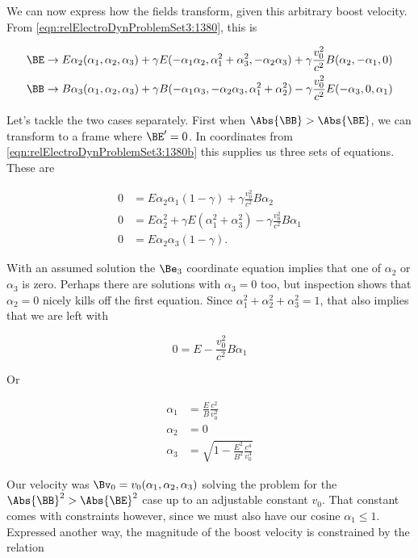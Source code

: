 We can now express how the fields transform, given this arbitrary boost velocity.  From \ref{eqn:relElectroDynProblemSet3:1380}, this is

\begin{align}\label{eqn:relElectroDynProblemSet3:1380b}
\BE &\rightarrow 
E \alpha_2 (\alpha_1, \alpha_2, \alpha_3) 
+ \gamma E (-\alpha_1 \alpha_2, \alpha_1^2 + \alpha_3^2, -\alpha_2 \alpha_3) 
+ \gamma \frac{v_0^2}{c^2} 
B (\alpha_2, -\alpha_1, 0) \\
\BB &\rightarrow
B \alpha_3 (\alpha_1, \alpha_2, \alpha_3)
+ \gamma B (-\alpha_1 \alpha_3, -\alpha_2 \alpha_3, \alpha_1^2 + \alpha_2^2)  
- \gamma \frac{v_0^2}{c^2} E (-\alpha_3, 0, \alpha_1)
\end{align}


Let's tackle the two cases separately.  First when $\Abs{\BB} > \Abs{\BE}$, we can transform to a frame where $\BE'=0$.  In coordinates from \ref{eqn:relElectroDynProblemSet3:1380b} this supplies us three sets of equations.  These are

\begin{align}\label{eqn:relElectroDynProblemSet3:1660}
0 &= E \alpha_2 \alpha_1 (1 - \gamma) + \gamma \frac{v_0^2}{c^2} B \alpha_2  \\
0 &= E \alpha_2^2 + \gamma E (\alpha_1^2 + \alpha_3^2) - \gamma \frac{v_0^2}{c^2} B \alpha_1  \\
0 &= E \alpha_2 \alpha_3 (1 - \gamma).
\end{align}

With an assumed solution the $\Be_3$ coordinate equation implies that one of $\alpha_2$ or $\alpha_3$ is zero.  Perhaps there are solutions with $\alpha_3 = 0$ too, but inspection shows that $\alpha_2 = 0$ nicely kills off the first equation.  Since $\alpha_1^2 + \alpha_2^2 + \alpha_3^2 = 1$, that also implies that we are left with

\begin{equation}\label{eqn:relElectroDynProblemSet3:1680}
0 = E - \frac{v_0^2}{c^2} B \alpha_1 
\end{equation}

Or

\begin{align}\label{eqn:relElectroDynProblemSet3:1700}
\alpha_1 &= \frac{E}{B} \frac{c^2}{v_0^2} \\
\alpha_2 &= 0 \\
\alpha_3 &= \sqrt{
1 - \frac{E^2}{B^2} \frac{c^4}{v_0^4} 
}
\end{align}

Our velocity was $\Bv_0 = v_0 (\alpha_1, \alpha_2, \alpha_3)$ solving the problem for the $\Abs{\BB}^2 > \Abs{\BE}^2$ case up to an adjustable constant $v_0$.  That constant comes with constraints however, since we must also have our cosine $\alpha_1 \le 1$.  Expressed another way, the magnitude of the boost velocity is constrained by the relation


